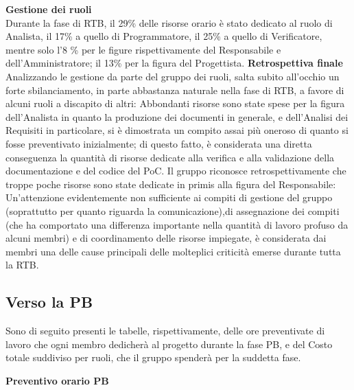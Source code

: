 \textbf{Gestione dei ruoli} \\
Durante la fase di RTB, il 29\% delle risorse orario è stato dedicato al ruolo di Analista, il 17\% a quello di Programmatore, il 25\% a quello di Verificatore, mentre
solo l'8 \% per le figure rispettivamente del Responsabile e dell'Amministratore; il 13\% per la figura del Progettista.
\textbf{Retrospettiva finale}
Analizzando le gestione da parte del gruppo dei ruoli, salta subito all'occhio un forte sbilanciamento, in parte abbastanza naturale nella fase di RTB, a favore di alcuni ruoli a discapito di altri: Abbondanti risorse sono state spese
per la figura dell'Analista in quanto la produzione dei documenti in generale, e dell'Analisi dei Requisiti in particolare, si è dimostrata un compito assai più oneroso di quanto si fosse preventivato
inizialmente; di questo fatto, è considerata una diretta conseguenza la quantità di risorse dedicate alla verifica e alla validazione della documentazione e del codice del PoC. Il gruppo riconosce retrospettivamente
che troppe poche risorse sono state dedicate in primis alla figura del Responsabile: Un'attenzione evidentemente non sufficiente ai compiti di gestione del gruppo (soprattutto per quanto riguarda la comunicazione),di assegnazione
dei compiti (che ha comportato una differenza importante nella quantità di lavoro profuso da alcuni membri) e
di coordinamento delle risorse impiegate, è considerata dai membri una delle cause principali delle molteplici criticità emerse durante tutta la RTB.
\subsection{Verso la PB}

Sono di seguito presenti le tabelle, rispettivamente, delle ore preventivate di lavoro che ogni membro dedicherà al progetto durante la fase PB, e del Costo
totale suddiviso per ruoli, che il gruppo spenderà per la suddetta fase.

\textbf{Preventivo orario PB}


